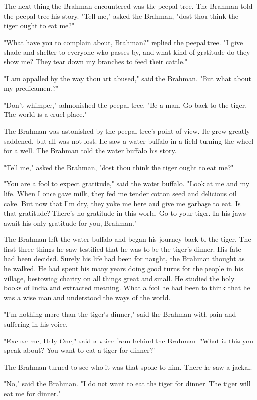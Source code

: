 The next thing the Brahman encountered was the peepal tree. The Brahman told the peepal tree his story. "Tell me," asked the Brahman, "dost thou think the tiger ought to eat me?"

"What have you to complain about, Brahman?" replied the peepal tree. "I give shade and shelter to everyone who passes by, and what kind of gratitude do they show me? They tear down my branches to feed their cattle."

"I am appalled by the way thou art abused," said the Brahman. "But what about my predicament?"

"Don't whimper," admonished the peepal tree. "Be a man. Go back to the tiger. The world is a cruel place."

The Brahman was astonished by the peepal tree's point of view. He grew greatly saddened, but all was not lost. He saw a water buffalo in a field turning the wheel for a well. The Brahman told the water buffalo his story.

"Tell me," asked the Brahman, "dost thou think the tiger ought to eat me?"

"You are a fool to expect gratitude," said the water buffalo. "Look at me and my life. When I once gave milk, they fed me tender cotton seed and delicious oil cake. But now that I'm dry, they yoke me here and give me garbage to eat. Is that gratitude? There's no gratitude in this world. Go to your tiger. In his jaws await his only gratitude for you, Brahman."

The Brahman left the water buffalo and began his journey back to the tiger. The first three things he saw testified that he was to be the tiger's dinner. His fate had been decided. Surely his life had been for naught, the Brahman thought as he walked. He had spent his many years doing good turns for the people in his village, bestowing charity on all things great and small. He studied the holy books of India and extracted meaning. What a fool he had been to think that he was a wise man and understood the ways of the world.

"I'm nothing more than the tiger's dinner," said the Brahman with pain and suffering in his voice.

"Excuse me, Holy One," said a voice from behind the Brahman. "What is this you speak about? You want to eat a tiger for dinner?"

The Brahman turned to see who it was that spoke to him. There he saw a jackal.

"No," said the Brahman. "I do not want to eat the tiger for dinner. The tiger will eat me for dinner."

